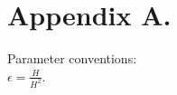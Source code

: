 

\chapter{Appendix A.} %

\label{AppendixA} %


Parameter conventions:\\

$\epsilon = \frac{\dot{H}}{H^2}.$





